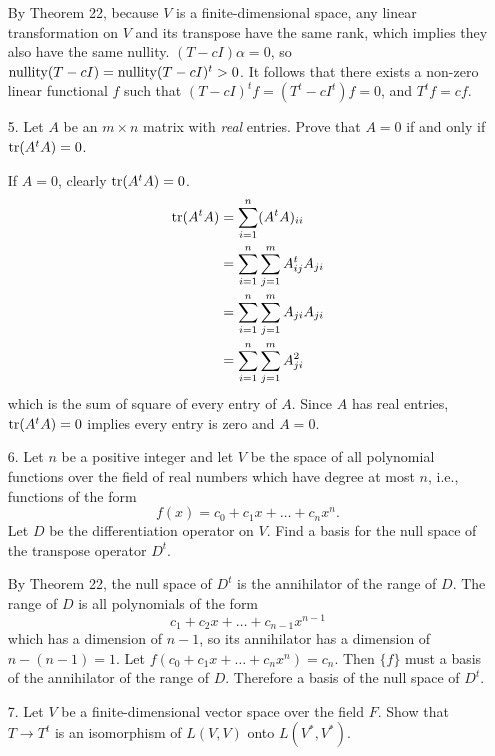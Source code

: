 \documentclass{article}
\begin{document}
\begin{enumerate}[listparindent=\parindent]
    By Theorem 22, because \(V\) is a finite-dimensional space,
    any linear transformation on \(V\) and its transpose have the same rank, which implies they also have the same nullity.
    \((T - cI)\alpha = 0\), so \(\operatorname{nullity} (T - cI) = \operatorname{nullity} (T - cI)^t > 0\).
    It follows that there exists a non-zero linear functional \(f\) such that \((T - cI)^tf = (T^t - cI^t)f = 0\), and \(T^tf = cf\).

\item[5.] Let \(A\) be an \(m \times n\) matrix with \textit{real} entries. Prove that \(A = 0\) if and only if \(\operatorname{tr}(A^tA) = 0\).

    If \(A = 0\), clearly \(\operatorname{tr}(A^tA) = 0\).
    \begin{align*}
        \operatorname{tr}(A^tA) &= \sum_{i=1}^n (A^tA)_{ii} \\
                  &= \sum_{i=1}^n \sum_{j=1}^m A^t_{ij}A_{ji} \\
                  &= \sum_{i=1}^n \sum_{j=1}^m A_{ji}A_{ji} \\
                  &= \sum_{i=1}^n \sum_{j=1}^m A_{ji}^2
    \end{align*}
    which is the sum of square of every entry of \(A\).
    Since \(A\) has real entries, \(\operatorname{tr}(A^tA) = 0\) implies every entry is zero and \(A = 0\).

\item[6.] Let \(n\) be a positive integer and let \(V\) be the space of all polynomial functions over the field of real numbers
    which have degree at most \(n\), i.e., functions of the form
    \[ f(x) = c_0 + c_1x + \dots + c_nx^n. \]
    Let \(D\) be the differentiation operator on \(V\). Find a basis for the null space of the transpose operator \(D^t\).

    By Theorem 22, the null space of \(D^t\) is the annihilator of the range of \(D\).
    The range of \(D\) is all polynomials of the form
    \[ c_1 + c_2x + \dots + c_{n-1}x^{n-1} \]
    which has a dimension of \(n - 1\), so its annihilator has a dimension of \(n - (n - 1) = 1\).
    Let \(f(c_0 + c_1x + \dots + c_nx^n) = c_n\).
    Then \(\{f\}\) must a basis of the annihilator of the range of \(D\).
    Therefore a basis of the null space of \(D^t\).

\item[7.] Let \(V\) be a finite-dimensional vector space over the field \(F\).
    Show that \(T \rightarrow T^t\) is an isomorphism of \(L(V, V)\) onto \(L(V^*, V^*)\).


\end{enumerate}
\end{document}
